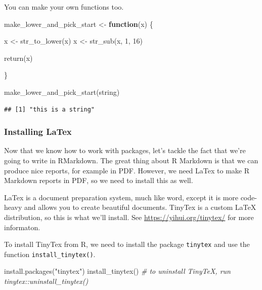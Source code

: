 \documentclass[
]{article}
\newenvironment{Shaded}{\begin{snugshade}}{\end{snugshade}}
\newcommand{\CommentTok}[1]{\textcolor[rgb]{0.56,0.35,0.01}{\textit{#1}}}
\newcommand{\ControlFlowTok}[1]{\textcolor[rgb]{0.13,0.29,0.53}{\textbf{#1}}}
\newcommand{\DecValTok}[1]{\textcolor[rgb]{0.00,0.00,0.81}{#1}}
\newcommand{\FunctionTok}[1]{\textcolor[rgb]{0.00,0.00,0.00}{#1}}
\newcommand{\NormalTok}[1]{#1}
\newcommand{\OtherTok}[1]{\textcolor[rgb]{0.56,0.35,0.01}{#1}}
\newcommand{\StringTok}[1]{\textcolor[rgb]{0.31,0.60,0.02}{#1}}
\begin{document}
You can make your own functions too.

\begin{Shaded}
\begin{Highlighting}[]
\NormalTok{make\_lower\_and\_pick\_start }\OtherTok{\textless{}{-}} \ControlFlowTok{function}\NormalTok{(x) \{}

\NormalTok{    x }\OtherTok{\textless{}{-}} \FunctionTok{str\_to\_lower}\NormalTok{(x)}
\NormalTok{    x }\OtherTok{\textless{}{-}} \FunctionTok{str\_sub}\NormalTok{(x, }\DecValTok{1}\NormalTok{, }\DecValTok{16}\NormalTok{)}

    \FunctionTok{return}\NormalTok{(x)}

\NormalTok{\}}

\FunctionTok{make\_lower\_and\_pick\_start}\NormalTok{(string)}
\end{Highlighting}
\end{Shaded}

\begin{verbatim}
## [1] "this is a string"
\end{verbatim}

\hypertarget{installing-latex}{%
\subsubsection{Installing LaTex}\label{installing-latex}}

Now that we know how to work with packages, let's tackle the fact that
we're going to write in RMarkdown. The great thing about R Markdown is
that we can produce nice reports, for example in PDF. However, we need
LaTex to make R Markdown reports in PDF, so we need to install this as
well.

LaTex is a document preparation system, much like word, except it is
more code-heavy and allows you to create beautiful documents. TinyTex is
a custom LaTeX distribution, so this is what we'll install. See
\url{https://yihui.org/tinytex/} for more informaton.

To install TinyTex from R, we need to install the package
\texttt{tinytex} and use the function \texttt{install\_tinytex()}.

\begin{Shaded}
\begin{Highlighting}[]
\FunctionTok{install.packages}\NormalTok{(}\StringTok{"tinytex"}\NormalTok{)}
\FunctionTok{install\_tinytex}\NormalTok{()}
\CommentTok{\# to uninstall TinyTeX, run tinytex::uninstall\_tinytex()}
\end{Highlighting}
\end{Shaded}
\end{document}
